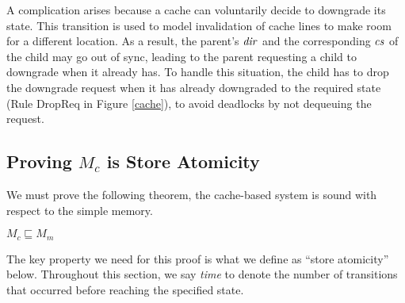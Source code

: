 
A complication arises because a cache can voluntarily decide to downgrade its
state.  This transition is used to model invalidation of cache lines to make
room for a different location.
As a result, the parent's $\mathit{dir}$ and the
corresponding $\mathit{cs}$ of the child may go out of sync, leading to the parent
requesting a child to downgrade when it already has. To handle this situation,
the child has to drop the downgrade request when it has already downgraded to
the required state (Rule DropReq in Figure \ref{cache}), to avoid deadlocks
by not dequeuing the request.

\subsection{Proving $M_c$ is Store Atomicity}\label{sec:ccproof}
\label{safety}

We must prove the following theorem, \ie{} the cache-based system is sound with
respect to the simple memory.
\begin{theorem}
\label{ccorrect}
$M_c \sqsubseteq M_m$
\end{theorem}

The key property we need for this proof is what we define as
``store atomicity'' below. Throughout this section, we say
\emph{time} to denote the number of transitions that occurred before reaching
the specified state.

